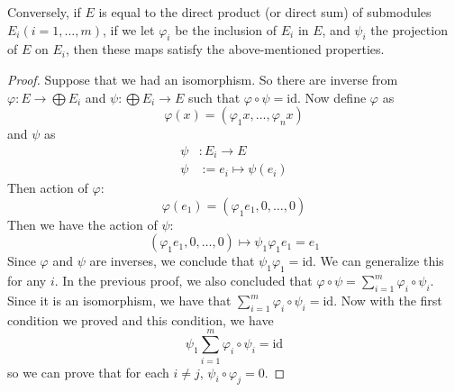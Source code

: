 \documentclass{article}
\begin{document}
Conversely, if $E$ is equal to the direct product (or direct sum) of submodules $E_{i}(i = 1, \ldots, m)$, if we let $\varphi_{i}$ be the inclusion of $E_{i}$ in $E$, and $\psi_{i}$ the projection of $E$ on $E_{i}$, then these maps satisfy the above-mentioned properties.
    \begin{proof}
        Suppose that we had an isomorphism. So there are inverse from $\varphi : E \rightarrow \bigoplus E_{i}$ and $\psi : \bigoplus E_{i} \rightarrow E$ such that $\varphi\circ\psi = \text{id}$. Now define $\varphi$ as
            \begin{equation*}
                \varphi(x) = (\varphi_{1}x, \ldots, \varphi_{n}x)
            \end{equation*}
        and $\psi$ as
            \begin{align*}
                \psi&: E_{i} \rightarrow E \\
                \psi&:= e_{i} \mapsto \psi(e_{i})
            \end{align*}
        Then action of $\varphi$:
            \begin{equation*}
                \varphi(e_{1}) = (\varphi_{1}e_{1}, 0, \ldots, 0)
            \end{equation*}
        Then we have the action of $\psi:$
            \begin{equation*}
                (\varphi_{1}e_{1}, 0, \ldots, 0) \mapsto \psi_{1}\varphi_{1}e_{1} = e_{1}
            \end{equation*}
        Since $\varphi$ and $\psi$ are inverses, we conclude that $\psi_{1}\varphi_{1} = \text{id}$. We can generalize this for any $i$. In the previous proof, we also concluded that $\varphi \circ \psi = \sum_{i = 1}^{m} \varphi_{i} \circ \psi_{i}$. Since it is an isomorphism, we have that $\sum_{i = 1}^{m} \varphi_{i} \circ \psi_{i} = \text{id}$. Now with the first condition we proved and this condition, we have
            \begin{equation*}
                \psi_{1} \sum_{i = 1}^{m}  \varphi_{i} \circ \psi_{i} = \text{id}
            \end{equation*}
        so we can prove that for each $i \neq j$, $\psi_{i} \circ \varphi_{j} = 0$.
    \end{proof}
\end{document}
